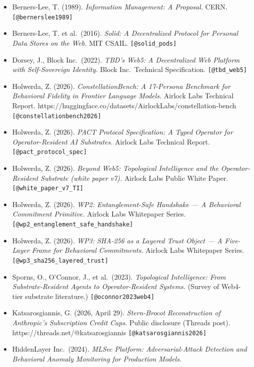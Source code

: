 \begin{itemize}
\tightlist
\item
  Berners-Lee, T. (1989). \emph{Information Management: A Proposal.}
  CERN. \texttt{{[}@bernerslee1989{]}}
\item
  Berners-Lee, T. et al.~(2016). \emph{Solid: A Decentralized Protocol
  for Personal Data Stores on the Web.} MIT CSAIL.
  \texttt{{[}@solid\_pods{]}}
\item
  Dorsey, J., Block Inc.~(2022). \emph{TBD's Web5: A Decentralized Web
  Platform with Self-Sovereign Identity.} Block Inc.~Technical
  Specification. \texttt{{[}@tbd\_web5{]}}
\item
  Holwerda, Z. (2026). \emph{ConstellationBench: A 17-Persona Benchmark
  for Behavioral Fidelity in Frontier Language Models.} Airlock Labs
  Technical Report.
  https://huggingface.co/datasets/AirlockLabs/constellation-bench
  \texttt{{[}@constellationbench2026{]}}
\item
  Holwerda, Z. (2026). \emph{PACT Protocol Specification: A Typed
  Operator for Operator-Resident AI Substrates.} Airlock Labs Technical
  Report. \texttt{{[}@pact\_protocol\_spec{]}}
\item
  Holwerda, Z. (2026). \emph{Beyond Web5: Topological Intelligence and
  the Operator-Resident Substrate (white paper v7).} Airlock Labs Public
  White Paper. \texttt{{[}@white\_paper\_v7\_TI{]}}
\item
  Holwerda, Z. (2026). \emph{WP2: Entanglement-Safe Handshake --- A
  Behavioral Commitment Primitive.} Airlock Labs Whitepaper Series.
  \texttt{{[}@wp2\_entanglement\_safe\_handshake{]}}
\item
  Holwerda, Z. (2026). \emph{WP3: SHA-256 as a Layered Trust Object ---
  A Five-Layer Frame for Behavioral Commitments.} Airlock Labs
  Whitepaper Series. \texttt{{[}@wp3\_sha256\_layered\_trust{]}}
\item
  Sporns, O., O'Connor, J., et al.~(2023). \emph{Topological
  Intelligence: From Substrate-Resident Agents to Operator-Resident
  Systems.} (Survey of Web4-tier substrate literature.)
  \texttt{{[}@oconnor2023web4{]}}
\item
  Katsarosgiannis, G. (2026, April 29). \emph{Stern-Brocot
  Reconstruction of Anthropic's Subscription Credit Caps.} Public
  disclosure (Threads post). https://threads.net/@katsarosgiannis
  \texttt{{[}@katsarosgiannis2026{]}}
\item
  HiddenLayer Inc.~(2024). \emph{MLSec Platform: Adversarial-Attack
  Detection and Behavioral Anomaly Monitoring for Production Models.}

\end{itemize}
